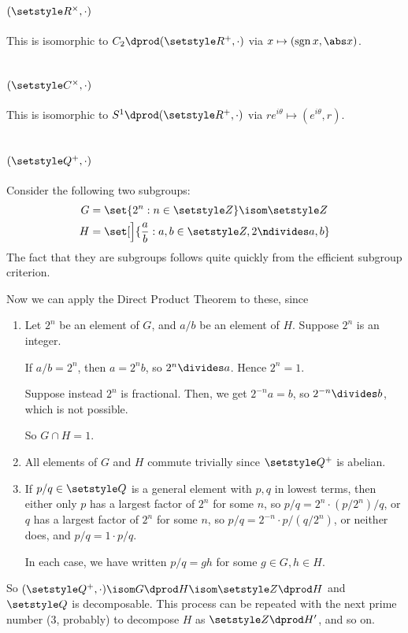 \documentclass[fleqn,a4paper,11pt]{article}
\begin{document}
\section{\((\R^\times, \cdot)\)}

This is isomorphic to \(C_2 \dprod (\R^+, \cdot)\) via
\(x \mapsto (\sgn x, \abs x)\).

\section{\((\CC^\times, \cdot)\)}

This is isomorphic to \(S^1 \dprod (\R^+, \cdot)\) via
\(re^{i\theta} \mapsto (e^{i\theta}, r)\).

\section{\((\Q^+, \cdot)\)}

Consider the following two subgroups:
\begin{align*}
 G &= \set{2^n : n \in \Z} \isom \Z \\
 H &= \set[\Big]{\frac ab : a, b \in \Z, 2 \ndivides a, b}
\end{align*}
The fact that they are subgroups follows quite quickly from the efficient
subgroup criterion.

Now we can apply the Direct Product Theorem to these, since
\begin{enumerate}[label=(\roman*)]
 \item
  Let \(2^n\) be an element of \(G\), and \(a/b\) be an element of \(H\).
  Suppose \(2^n\) is an integer.

  If \(a/b = 2^n\), then \(a = 2^n b\), so \(2^n \divides a\). Hence \(2^n = 1\).

  Suppose instead \(2^n\) is fractional. Then, we get \(2^{-n} a = b\), so
  \(2^{-n} \divides b\), which is not possible.

  So \(G \cap H = {1}\).
 \item
  All elements of \(G\) and \(H\) commute trivially since \(\Q^+\) is abelian.
 \item
  If \(p/q \in \Q\) is a general element with \(p, q\) in lowest terms, then
  either only \(p\) has a largest factor of \(2^n\) for some \(n\), so
  \(p/q = 2^n \cdot (p/2^n)/q\), or \(q\) has a largest factor of \(2^n\) for
  some \(n\), so \(p/q = 2^{-n} \cdot p/(q/2^n)\), or neither does, and
  \(p/q = 1 \cdot p/q\).

  In each case, we have written \(p/q = gh\) for some \(g \in G, h \in H\).
\end{enumerate}
So \((\Q^+, \cdot) \isom G \dprod H \isom \Z \dprod H\) and \(\Q\) is
decomposable. This process can be repeated with the next prime number (\(3\),
probably) to decompose \(H\) as \(\Z \dprod H'\), and so on.
\end{document}

